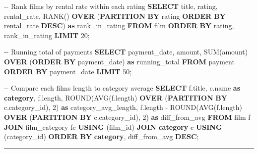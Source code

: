 \documentclass[
  letterpaper,
  DIV=11,
  numbers=noendperiod]{scrartcl}
\newenvironment{Shaded}{\begin{snugshade}}{\end{snugshade}}
\newcommand{\CommentTok}[1]{\textcolor[rgb]{0.37,0.37,0.37}{#1}}
\newcommand{\DecValTok}[1]{\textcolor[rgb]{0.68,0.00,0.00}{#1}}
\newcommand{\FunctionTok}[1]{\textcolor[rgb]{0.28,0.35,0.67}{#1}}
\newcommand{\KeywordTok}[1]{\textcolor[rgb]{0.00,0.23,0.31}{\textbf{#1}}}
\newcommand{\NormalTok}[1]{\textcolor[rgb]{0.00,0.23,0.31}{#1}}
\newcommand{\OperatorTok}[1]{\textcolor[rgb]{0.37,0.37,0.37}{#1}}
\begin{document}
\begin{Shaded}
\begin{Highlighting}[]
\CommentTok{{-}{-} Rank films by rental rate within each rating}
\KeywordTok{SELECT}\NormalTok{ title, rating, rental\_rate,}
       \FunctionTok{RANK}\NormalTok{() }\KeywordTok{OVER}\NormalTok{ (}\KeywordTok{PARTITION} \KeywordTok{BY}\NormalTok{ rating }\KeywordTok{ORDER} \KeywordTok{BY}\NormalTok{ rental\_rate }\KeywordTok{DESC}\NormalTok{) }\KeywordTok{as}\NormalTok{ rank\_in\_rating}
\KeywordTok{FROM}\NormalTok{ film}
\KeywordTok{ORDER} \KeywordTok{BY}\NormalTok{ rating, rank\_in\_rating}
\KeywordTok{LIMIT} \DecValTok{20}\NormalTok{;}

\CommentTok{{-}{-} Running total of payments}
\KeywordTok{SELECT}\NormalTok{ payment\_date,}
\NormalTok{       amount,}
       \FunctionTok{SUM}\NormalTok{(amount) }\KeywordTok{OVER}\NormalTok{ (}\KeywordTok{ORDER} \KeywordTok{BY}\NormalTok{ payment\_date) }\KeywordTok{as}\NormalTok{ running\_total}
\KeywordTok{FROM}\NormalTok{ payment}
\KeywordTok{ORDER} \KeywordTok{BY}\NormalTok{ payment\_date}
\KeywordTok{LIMIT} \DecValTok{50}\NormalTok{;}

\CommentTok{{-}{-} Compare each film\textquotesingle{}s length to category average}
\KeywordTok{SELECT}\NormalTok{ f.title, c.name }\KeywordTok{as} \KeywordTok{category}\NormalTok{, f.}\FunctionTok{length}\NormalTok{,}
       \FunctionTok{ROUND}\NormalTok{(}\FunctionTok{AVG}\NormalTok{(f.}\FunctionTok{length}\NormalTok{) }\KeywordTok{OVER}\NormalTok{ (}\KeywordTok{PARTITION} \KeywordTok{BY}\NormalTok{ c.category\_id), }\DecValTok{2}\NormalTok{) }\KeywordTok{as}\NormalTok{ category\_avg\_length,}
\NormalTok{       f.}\FunctionTok{length} \OperatorTok{{-}} \FunctionTok{ROUND}\NormalTok{(}\FunctionTok{AVG}\NormalTok{(f.}\FunctionTok{length}\NormalTok{) }\KeywordTok{OVER}\NormalTok{ (}\KeywordTok{PARTITION} \KeywordTok{BY}\NormalTok{ c.category\_id), }\DecValTok{2}\NormalTok{) }\KeywordTok{as}\NormalTok{ diff\_from\_avg}
\KeywordTok{FROM}\NormalTok{ film f}
\KeywordTok{JOIN}\NormalTok{ film\_category fc }\KeywordTok{USING}\NormalTok{ (film\_id)}
\KeywordTok{JOIN} \KeywordTok{category}\NormalTok{ c }\KeywordTok{USING}\NormalTok{ (category\_id)}
\KeywordTok{ORDER} \KeywordTok{BY} \KeywordTok{category}\NormalTok{, diff\_from\_avg }\KeywordTok{DESC}\NormalTok{;}
\end{Highlighting}
\end{Shaded}

\begin{center}\rule{0.5\linewidth}{0.5pt}\end{center}
\end{document}
